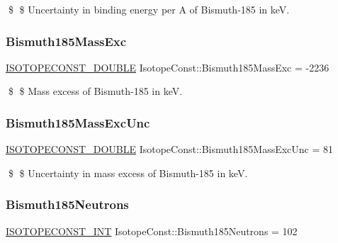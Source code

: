 \$ \$ Uncertainty in binding energy per A of Bismuth-\/185 in keV. \mbox{\label{group___isotope_const-_bismuth-_bi185_gac4607fa7d2f3619250054caa5e82ab34}} 
\subsubsection{\texorpdfstring{Bismuth185\+Mass\+Exc}{Bismuth185MassExc}}
{\footnotesize\ttfamily \mbox{\hyperlink{group___isotope_const-_macros_ga8f45a7272ce02c0b4c65c44636ed719a}{I\+S\+O\+T\+O\+P\+E\+C\+O\+N\+S\+T\+\_\+\+D\+O\+U\+B\+LE}} Isotope\+Const\+::\+Bismuth185\+Mass\+Exc = -\/2236}

\$ \$ Mass excess of Bismuth-\/185 in keV. \mbox{\label{group___isotope_const-_bismuth-_bi185_ga45150b0da3d25227f50535536f3755d3}} 
\subsubsection{\texorpdfstring{Bismuth185\+Mass\+Exc\+Unc}{Bismuth185MassExcUnc}}
{\footnotesize\ttfamily \mbox{\hyperlink{group___isotope_const-_macros_ga8f45a7272ce02c0b4c65c44636ed719a}{I\+S\+O\+T\+O\+P\+E\+C\+O\+N\+S\+T\+\_\+\+D\+O\+U\+B\+LE}} Isotope\+Const\+::\+Bismuth185\+Mass\+Exc\+Unc = 81}

\$ \$ Uncertainty in mass excess of Bismuth-\/185 in keV. \mbox{\label{group___isotope_const-_bismuth-_bi185_gafb87d93d85622a6511cb7d0d9c426f24}} 
\subsubsection{\texorpdfstring{Bismuth185\+Neutrons}{Bismuth185Neutrons}}
{\footnotesize\ttfamily \mbox{\hyperlink{group___isotope_const-_macros_ga5f18360b3e99483a35c32d789e62621c}{I\+S\+O\+T\+O\+P\+E\+C\+O\+N\+S\+T\+\_\+\+I\+NT}} Isotope\+Const\+::\+Bismuth185\+Neutrons = 102}

